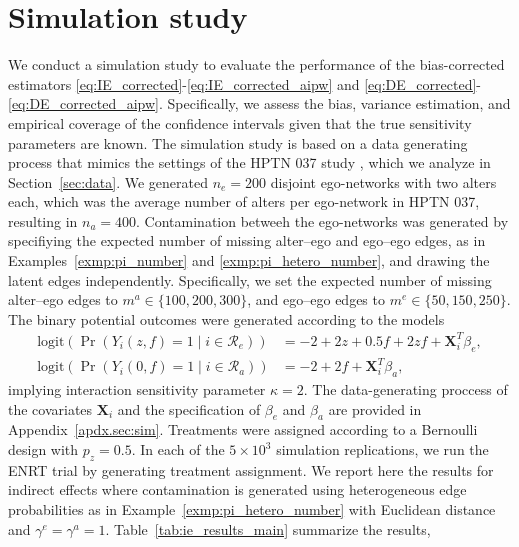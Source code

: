 \documentclass[11pt]{article}
\theoremstyle{definition}
\def \bX {\boldsymbol{X}}
\def \cR {\mathcal{R}}
\begin{document}
\section{Simulation study}
\label{sec:sim}

We conduct a simulation study to evaluate the performance of the bias-corrected 
estimators \eqref{eq:IE_corrected}-\eqref{eq:IE_corrected_aipw} and 
\eqref{eq:DE_corrected}-\eqref{eq:DE_corrected_aipw}. 
Specifically, we assess the bias, variance estimation, and empirical coverage of the confidence intervals
given that the true sensitivity parameters are known. 
The simulation study is based on a data generating process
 that mimics the settings of the HPTN 037 study \citep{Latkin2009}, 
which we analyze in Section~\ref{sec:data}.
We generated $n_e=200$ disjoint ego-networks with two alters each,
which was the average number of alters per ego-network in HPTN 037,
resulting in $n_a=400$.
Contamination betweeh the ego-networks was generated
 by specifiying the expected number of missing
alter--ego and ego--ego edges, as in Examples~\ref{exmp:pi_number} and \ref{exmp:pi_hetero_number},
and drawing the latent edges independently. 
Specifically, we set the expected number of missing alter--ego edges to $m^a \in \{100,200,300\}$,
and ego--ego edges to $m^e \in \{50,150,250\}$. 
The binary potential outcomes were generated according to the models
    \begin{equation*}
        \begin{aligned}
            \text{logit}\left(\Pr\left(Y_i(z,f)=1 \mid i \in \cR_e\right)\right) &= -2 + 2 z + 0.5 f + 2 zf + \bX_i^T \beta_e,
            \\ 
            \text{logit}\left(\Pr\left(Y_i(0,f)=1 \mid i \in \cR_a\right)\right) &= -2 + 2 f + \bX_i^T \beta_a,        
        \end{aligned}
    \end{equation*}
implying interaction sensitivity parameter $\kappa=2$.
The data-generating proccess of the covariates $\bX_i$ and the specification of $\beta_e$ and $\beta_a$
are provided in Appendix~\ref{apdx.sec:sim}.
Treatments were assigned according to a Bernoulli design with $p_z=0.5$.
In each of the $5 \times 10^3$ simulation replications,
we run the ENRT trial by generating treatment assignment.
We report here the results for indirect effects where contamination is generated using   
heterogeneous edge probabilities as in Example~\ref{exmp:pi_hetero_number}
with Euclidean distance and $\gamma^e=\gamma^a=1$.
Table~\ref{tab:ie_results_main} summarize the results,
\end{document}
